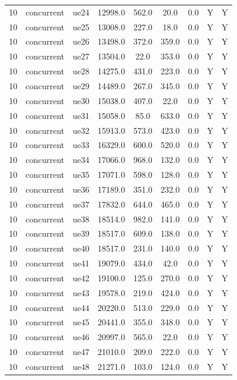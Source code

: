 \begin{table}[ht]
\begin{tabular}{|c|c|c|c|c|c|c|c|c|}
10 & concurrent & ue24 & 12998.0 & 562.0 & 20.0 & 0.0 & Y & Y \\
10 & concurrent & ue25 & 13008.0 & 227.0 & 18.0 & 0.0 & Y & Y \\
10 & concurrent & ue26 & 13498.0 & 372.0 & 359.0 & 0.0 & Y & Y \\
10 & concurrent & ue27 & 13504.0 & 22.0 & 353.0 & 0.0 & Y & Y \\
10 & concurrent & ue28 & 14275.0 & 431.0 & 223.0 & 0.0 & Y & Y \\
10 & concurrent & ue29 & 14489.0 & 267.0 & 345.0 & 0.0 & Y & Y \\
10 & concurrent & ue30 & 15038.0 & 407.0 & 22.0 & 0.0 & Y & Y \\
10 & concurrent & ue31 & 15058.0 & 85.0 & 633.0 & 0.0 & Y & Y \\
10 & concurrent & ue32 & 15913.0 & 573.0 & 423.0 & 0.0 & Y & Y \\
10 & concurrent & ue33 & 16329.0 & 600.0 & 520.0 & 0.0 & Y & Y \\
10 & concurrent & ue34 & 17066.0 & 968.0 & 132.0 & 0.0 & Y & Y \\
10 & concurrent & ue35 & 17071.0 & 598.0 & 128.0 & 0.0 & Y & Y \\
10 & concurrent & ue36 & 17189.0 & 351.0 & 232.0 & 0.0 & Y & Y \\
10 & concurrent & ue37 & 17832.0 & 644.0 & 465.0 & 0.0 & Y & Y \\
10 & concurrent & ue38 & 18514.0 & 982.0 & 141.0 & 0.0 & Y & Y \\
10 & concurrent & ue39 & 18517.0 & 609.0 & 138.0 & 0.0 & Y & Y \\
10 & concurrent & ue40 & 18517.0 & 231.0 & 140.0 & 0.0 & Y & Y \\
10 & concurrent & ue41 & 19079.0 & 434.0 & 42.0 & 0.0 & Y & Y \\
10 & concurrent & ue42 & 19100.0 & 125.0 & 270.0 & 0.0 & Y & Y \\
10 & concurrent & ue43 & 19578.0 & 219.0 & 424.0 & 0.0 & Y & Y \\
10 & concurrent & ue44 & 20220.0 & 513.0 & 229.0 & 0.0 & Y & Y \\
10 & concurrent & ue45 & 20441.0 & 355.0 & 348.0 & 0.0 & Y & Y \\
10 & concurrent & ue46 & 20997.0 & 565.0 & 22.0 & 0.0 & Y & Y \\
10 & concurrent & ue47 & 21010.0 & 209.0 & 222.0 & 0.0 & Y & Y \\
10 & concurrent & ue48 & 21271.0 & 103.0 & 124.0 & 0.0 & Y & Y \\

\end{tabular}
\end{table}

